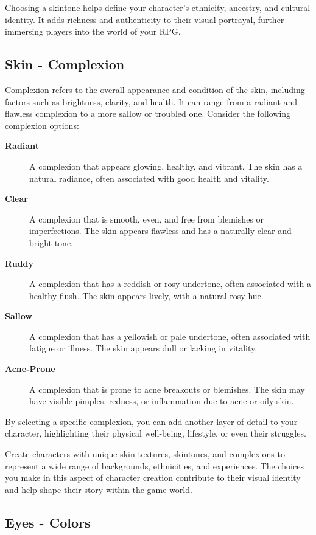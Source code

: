 Choosing a skintone helps define your character's ethnicity, ancestry, and cultural identity. It adds richness and authenticity to their visual portrayal, further immersing players into the world of your RPG.

\subsection{\textbf{Skin  - Complexion}}

Complexion refers to the overall appearance and condition of the skin, including factors such as brightness, clarity, and health. It can range from a radiant and flawless complexion to a more sallow or troubled one. Consider the following complexion options:

\begin{description}
    \item[\textbf{Radiant}] A complexion that appears glowing, healthy, and vibrant. The skin has a natural radiance, often associated with good health and vitality.
    \item[\textbf{Clear}] A complexion that is smooth, even, and free from blemishes or imperfections. The skin appears flawless and has a naturally clear and bright tone.
    \item[\textbf{Ruddy}] A complexion that has a reddish or rosy undertone, often associated with a healthy flush. The skin appears lively, with a natural rosy hue.
    \item[\textbf{Sallow}] A complexion that has a yellowish or pale undertone, often associated with fatigue or illness. The skin appears dull or lacking in vitality.
    \item[\textbf{Acne-Prone}] A complexion that is prone to acne breakouts or blemishes. The skin may have visible pimples, redness, or inflammation due to acne or oily skin.
\end{description}

By selecting a specific complexion, you can add another layer of detail to your character, highlighting their physical well-being, lifestyle, or even their struggles.

Create characters with unique skin textures, skintones, and complexions to represent a wide range of backgrounds, ethnicities, and experiences. The choices you make in this aspect of character creation contribute to their visual identity and help shape their story within the game world.

\subsection{\textbf{Eyes - Colors}}


